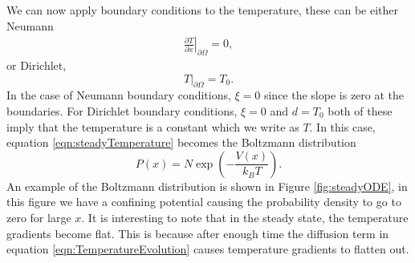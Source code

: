 We can now apply boundary conditions to the temperature, these can be either Neumann
\begin{eqnarray}
\left.\frac{\partial T}{\partial x}\right\rvert_{\partial \Omega} = 0,
\end{eqnarray}
or Dirichlet,
\begin{equation}
T \rvert_{\partial \Omega} = T_0.
\end{equation}
In the case of Neumann boundary conditions, $\xi = 0$ since the slope is zero at the boundaries. For Dirichlet boundary conditions, $\xi = 0$ and $d = T_0$ both of these imply that the temperature is a constant which we write as $T$. In this case, equation \ref{eqn:steadyTemperature} becomes the Boltzmann distribution
\begin{equation}
P(x) = N \exp{\left (-\frac{V(x)}{k_B T} \right)}.
\end{equation}
An example of the Boltzmann distribution is shown in Figure \ref{fig:steadyODE}, in this figure we have a confining potential causing the probability density to go to zero for large $x$. It is interesting to note that in the steady state, the temperature gradients become flat. This is because after enough time the diffusion term in equation \ref{eqn:TemperatureEvolution} causes temperature gradients to flatten out.

